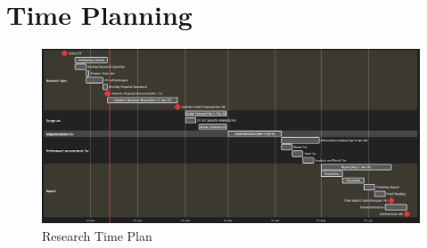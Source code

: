 \section{Time Planning}

\begin{figure}[H]
    \centering
    \includegraphics[width=1\textwidth]{images/plan.png}
    \caption{Research Time Plan}
    \label{fig:test_results}
\end{figure}